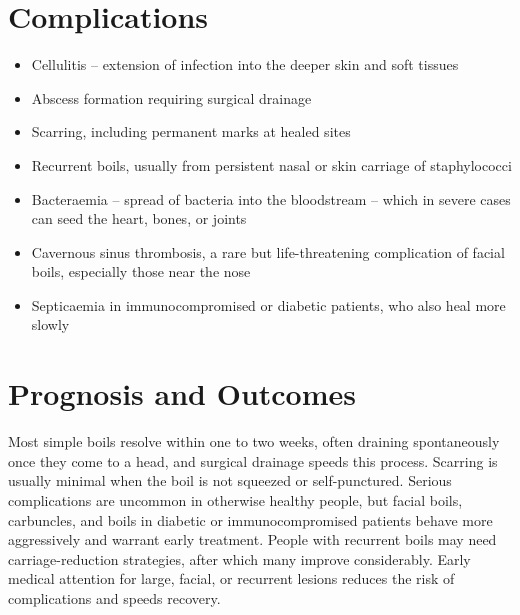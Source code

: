\section*{Complications}
\begin{itemize}
    \item Cellulitis -- extension of infection into the deeper skin and soft tissues
    \item Abscess formation requiring surgical drainage
    \item Scarring, including permanent marks at healed sites
    \item Recurrent boils, usually from persistent nasal or skin carriage of staphylococci
    \item Bacteraemia -- spread of bacteria into the bloodstream -- which in severe cases can seed the heart, bones, or joints
    \item Cavernous sinus thrombosis, a rare but life-threatening complication of facial boils, especially those near the nose
    \item Septicaemia in immunocompromised or diabetic patients, who also heal more slowly
\end{itemize}

\section*{Prognosis and Outcomes}
Most simple boils resolve within one to two weeks, often draining spontaneously once they come to a head, and surgical drainage speeds this process. Scarring is usually minimal when the boil is not squeezed or self-punctured. Serious complications are uncommon in otherwise healthy people, but facial boils, carbuncles, and boils in diabetic or immunocompromised patients behave more aggressively and warrant early treatment. People with recurrent boils may need carriage-reduction strategies, after which many improve considerably. Early medical attention for large, facial, or recurrent lesions reduces the risk of complications and speeds recovery.

